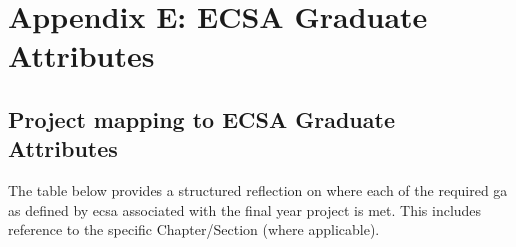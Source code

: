 

\chapter*{Appendix E: ECSA Graduate Attributes}

\section*{Project mapping to ECSA Graduate Attributes}
{}

The table below provides a structured reflection on where each of the required \gls{ga} as defined by \gls{ecsa} associated with the final year project is met. This includes reference to the specific Chapter/Section (where applicable). 

\vspace{1em}


